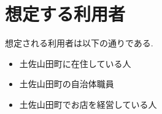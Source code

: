\section{想定する利用者}
想定される利用者は以下の通りである.
\begin{itemize}
    \item 土佐山田町に在住している人
    \item 土佐山田町の自治体職員
    \item 土佐山田町でお店を経営している人
\end{itemize}

